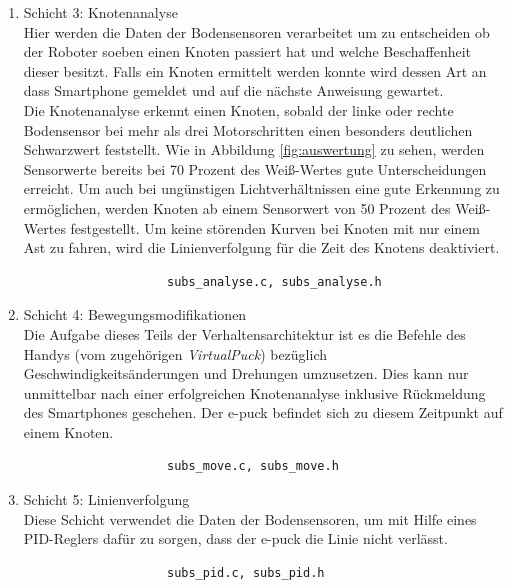 \documentclass[10pt,a4paper]{article}
\begin{document}
\begin{enumerate}
				\item Schicht 3: Knotenanalyse \\
					Hier werden die Daten der Bodensensoren verarbeitet um zu entscheiden ob der Roboter soeben einen Knoten passiert hat und welche
					Beschaffenheit dieser besitzt. Falls ein Knoten ermittelt werden konnte wird dessen Art an dass Smartphone gemeldet und auf
					die nächste Anweisung gewartet.	\\
					Die Knotenanalyse erkennt einen Knoten, sobald der linke oder rechte Bodensensor bei mehr als drei Motorschritten einen besonders
					deutlichen Schwarzwert feststellt. Wie in Abbildung \ref{fig:auswertung} zu sehen, werden Sensorwerte bereits bei 70 Prozent des
					Weiß-Wertes gute Unterscheidungen erreicht. Um auch bei ungünstigen Lichtverhältnissen eine gute Erkennung zu ermöglichen,
					werden Knoten ab einem Sensorwert von 50 Prozent des Weiß-Wertes festgestellt. Um keine störenden Kurven bei Knoten mit nur einem
					Ast zu fahren, wird die Linienverfolgung für die Zeit des Knotens deaktiviert. 				

					\begin{verbatim}  
					subs_analyse.c, subs_analyse.h
					\end{verbatim}

				\item Schicht 4: Bewegungsmodifikationen \\
					Die Aufgabe dieses Teils der Verhaltensarchitektur ist es die Befehle des Handys (vom zugehörigen \textit{VirtualPuck}) bezüglich
					Geschwindigkeitsänderungen und Drehungen	 umzusetzen. Dies kann nur unmittelbar nach einer erfolgreichen Knotenanalyse
					inklusive Rückmeldung des Smartphones geschehen. Der e-puck befindet sich zu diesem Zeitpunkt auf einem Knoten.			

					\begin{verbatim}  
					subs_move.c, subs_move.h
					\end{verbatim}

  				\item Schicht 5: Linienverfolgung \\
					Diese Schicht verwendet die Daten der Bodensensoren, um mit Hilfe eines PID-Reglers dafür zu sorgen, dass der e-puck die Linie
					nicht verlässt. \\

					\begin{verbatim}
					subs_pid.c, subs_pid.h
					\end{verbatim}

  			\end{enumerate}
\end{document}
